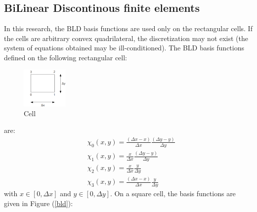 \subsection{BiLinear Discontinous finite elements}
In this research, the BLD basis functions are used only on the rectangular
cells. If the cells are arbitrary convex quadrilateral, the discretization may
not exist (the system of equations obtained may be ill-conditioned). The BLD basis 
functions defined on the following rectangular cell:
\begin{figure}[H]
  \centering
  \includegraphics[width=0.2\textwidth]{./Spatial_discretizations/cell}
  \caption{Cell}
\end{figure}
are:
\begin{align}
  &\chi_0(x,y) = \frac{(\Delta x-x)}{\Delta x}\frac{(\Delta y-y)}{\Delta y}\\
  &\chi_1(x,y) = \frac{x}{\Delta x}\frac{(\Delta y-y)}{\Delta y}\\
  &\chi_2(x,y) = \frac{x}{\Delta x}\frac{y}{\Delta y}\\
  &\chi_3(x,y) = \frac{(\Delta x-x)}{\Delta x}\frac{y}{\Delta y}
\end{align}
with $x\in[0,\Delta x]$ and $y\in[0,\Delta y]$. On a square cell, the basis 
functions are given in Figure (\ref{bld}):
